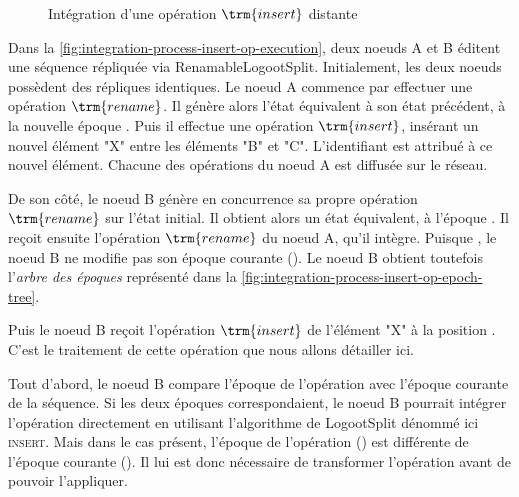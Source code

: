 \begin{figure}[t!]
{\begin{minipage}{\linewidth}
        \label{fig:integration-process-insert-op-epoch-tree}
    \end{minipage}}
  \caption{Intégration d'une opération $\trm{insert}$ distante}
  \label{fig:integration-process-insert-op}
\end{figure}


Dans la \autoref{fig:integration-process-insert-op-execution}, deux noeuds A et B éditent une séquence répliquée via RenamableLogootSplit.
Initialement, les deux noeuds possèdent des répliques identiques.
Le noeud A commence par effectuer une opération $\trm{rename}$.
Il génère alors l'état équivalent à son état précédent, à la nouvelle époque .
Puis il effectue une opération $\trm{insert}$, insérant un nouvel élément "X" entre les éléments "B" et "C".
L'identifiant  est attribué à ce nouvel élément.
Chacune des opérations du noeud A est diffusée sur le réseau.

De son côté, le noeud B génère en concurrence sa propre opération $\trm{rename}$ sur l'état initial.
Il obtient alors un état équivalent, à l'époque .
Il reçoit ensuite l'opération $\trm{rename}$ du noeud A, qu'il intègre.
Puisque  \lepoch {}, le noeud B ne modifie pas son époque courante ().
Le noeud B obtient toutefois l'\emph{arbre des époques} représenté dans la \autoref{fig:integration-process-insert-op-epoch-tree}.

Puis le noeud B reçoit l'opération $\trm{insert}$ de l'élément "X" à la position .
C'est le traitement de cette opération que nous allons détailler ici.

Tout d'abord, le noeud B compare l'époque de l'opération avec l'époque courante de la séquence.
Si les deux époques correspondaient, le noeud B pourrait intégrer l'opération directement en utilisant l'algorithme de LogootSplit dénommé ici \textsc{insert}.
Mais dans le cas présent, l'époque de l'opération () est différente de l'époque courante ().
Il lui est donc nécessaire de transformer l'opération avant de pouvoir l'appliquer.

